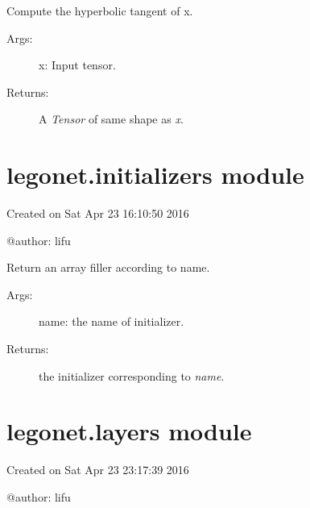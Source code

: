 \documentclass[letterpaper,10pt,english]{sphinxmanual}
\begin{document}
\begin{fulllineitems}
\label{legonet:legonet.activations.tanh}
Compute the hyperbolic tangent of x.
\begin{description}
\item[{Args:}] \leavevmode
x: Input tensor.

\item[{Returns:}] \leavevmode
A \emph{Tensor} of same shape as \emph{x}.

\end{description}

\end{fulllineitems}



\section{legonet.initializers module}
\label{legonet:legonet-initializers-module}\label{legonet:module-legonet.initializers}
Created on Sat Apr 23 16:10:50 2016

@author: lifu

\begin{fulllineitems}
\label{legonet:legonet.initializers.get}
Return an array filler according to name.
\begin{description}
\item[{Args:}] \leavevmode
name: the name of initializer.

\item[{Returns:}] \leavevmode
the initializer corresponding to \emph{name}.

\end{description}

\end{fulllineitems}



\section{legonet.layers module}
\label{legonet:module-legonet.layers}\label{legonet:legonet-layers-module}
Created on Sat Apr 23 23:17:39 2016

@author: lifu
\end{document}
